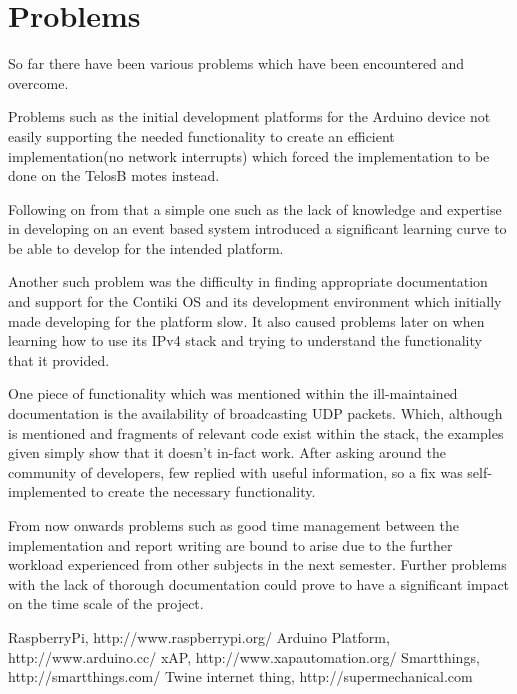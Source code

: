 \documentclass[a4paper,twocolumn]{article}
\begin{document}
\section{Problems} %
\label{sec:problems}
So far there have been various problems which have been encountered and overcome.

Problems such as the initial development platforms for the Arduino device not easily supporting the needed functionality to create an efficient implementation(no network interrupts) which forced the implementation to be done on the TelosB motes instead.

Following on from that a simple one such as the lack of knowledge and expertise in developing on an event based system introduced a significant learning curve to be able to develop for the intended platform.

Another such problem was the difficulty in finding appropriate documentation and support for the Contiki OS and its development environment which initially made developing for the platform slow. It also caused problems later on when learning how to use its IPv4 stack and trying to understand the functionality that it provided. 

One piece of functionality which was mentioned within the ill-maintained documentation is the availability of broadcasting UDP packets. Which, although is mentioned and fragments of relevant code exist within the stack, the examples given simply show that it doesn't in-fact work. After asking around the community of developers, few replied with useful information, so a fix was self-implemented to create the necessary functionality.  

From now onwards problems such as good time management between the implementation and report writing are bound to arise due to the further workload experienced from other subjects in the next semester. Further problems with the lack of thorough documentation could prove to have a significant impact on the time scale of the project.



\begin{thebibliography}{19}
	 RaspberryPi, http://www.raspberrypi.org/
	 Arduino Platform, http://www.arduino.cc/
	 xAP, http://www.xapautomation.org/
	 Smartthings, http://smartthings.com/
	 Twine internet thing, http://supermechanical.com
\end{thebibliography}
\end{document}
